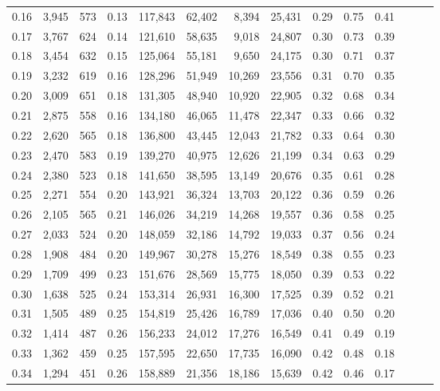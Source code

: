 \begin{tabular}{rrrrrrrrrrrrrr}
0.16 &   3,945 &  573 &  0.13 &  117,843 &   62,402 &   8,394 &  25,431 &  0.29 &  0.75 &      0.41 \\
0.17 &   3,767 &  624 &  0.14 &  121,610 &   58,635 &   9,018 &  24,807 &  0.30 &  0.73 &      0.39 \\
0.18 &   3,454 &  632 &  0.15 &  125,064 &   55,181 &   9,650 &  24,175 &  0.30 &  0.71 &      0.37 \\
0.19 &   3,232 &  619 &  0.16 &  128,296 &   51,949 &  10,269 &  23,556 &  0.31 &  0.70 &      0.35 \\
0.20 &   3,009 &  651 &  0.18 &  131,305 &   48,940 &  10,920 &  22,905 &  0.32 &  0.68 &      0.34 \\
0.21 &   2,875 &  558 &  0.16 &  134,180 &   46,065 &  11,478 &  22,347 &  0.33 &  0.66 &      0.32 \\
0.22 &   2,620 &  565 &  0.18 &  136,800 &   43,445 &  12,043 &  21,782 &  0.33 &  0.64 &      0.30 \\
0.23 &   2,470 &  583 &  0.19 &  139,270 &   40,975 &  12,626 &  21,199 &  0.34 &  0.63 &      0.29 \\
0.24 &   2,380 &  523 &  0.18 &  141,650 &   38,595 &  13,149 &  20,676 &  0.35 &  0.61 &      0.28 \\
0.25 &   2,271 &  554 &  0.20 &  143,921 &   36,324 &  13,703 &  20,122 &  0.36 &  0.59 &      0.26 \\
0.26 &   2,105 &  565 &  0.21 &  146,026 &   34,219 &  14,268 &  19,557 &  0.36 &  0.58 &      0.25 \\
0.27 &   2,033 &  524 &  0.20 &  148,059 &   32,186 &  14,792 &  19,033 &  0.37 &  0.56 &      0.24 \\
0.28 &   1,908 &  484 &  0.20 &  149,967 &   30,278 &  15,276 &  18,549 &  0.38 &  0.55 &      0.23 \\
0.29 &   1,709 &  499 &  0.23 &  151,676 &   28,569 &  15,775 &  18,050 &  0.39 &  0.53 &      0.22 \\
0.30 &   1,638 &  525 &  0.24 &  153,314 &   26,931 &  16,300 &  17,525 &  0.39 &  0.52 &      0.21 \\
0.31 &   1,505 &  489 &  0.25 &  154,819 &   25,426 &  16,789 &  17,036 &  0.40 &  0.50 &      0.20 \\
0.32 &   1,414 &  487 &  0.26 &  156,233 &   24,012 &  17,276 &  16,549 &  0.41 &  0.49 &      0.19 \\
0.33 &   1,362 &  459 &  0.25 &  157,595 &   22,650 &  17,735 &  16,090 &  0.42 &  0.48 &      0.18 \\
0.34 &   1,294 &  451 &  0.26 &  158,889 &   21,356 &  18,186 &  15,639 &  0.42 &  0.46 &      0.17 \\

\end{tabular}
